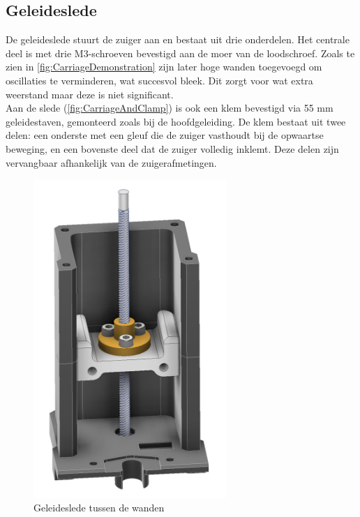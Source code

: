 \subsection{Geleideslede}
De geleideslede stuurt de zuiger aan en bestaat uit drie onderdelen. Het centrale deel is met drie M3-schroeven bevestigd aan de moer van de loodschroef. Zoals te zien in \autoref{fig:CarriageDemonstration} zijn later hoge wanden toegevoegd om oscillaties te verminderen, wat succesvol bleek. Dit zorgt voor wat extra weerstand maar deze is niet significant.
\\[12pt]Aan de slede (\autoref{fig:CarriageAndClamp}) is ook een klem bevestigd via 55 mm geleidestaven, gemonteerd zoals bij de hoofdgeleiding. De klem bestaat uit twee delen: een onderste met een gleuf die de zuiger vasthoudt bij de opwaartse beweging, en een bovenste deel dat de zuiger volledig inklemt. Deze delen zijn vervangbaar afhankelijk van de zuigerafmetingen.
\\[12pt]\begin{minipage}[t]{0.39\textwidth}
    \vspace{0pt}
    \begin{figure}[H]
        \centering
        \captionsetup{width=1\textwidth} %
        \includegraphics[width=0.65\textwidth]{figures/CarriageDemonstration.png}
        \caption{Geleideslede tussen de wanden}\label{fig:CarriageDemonstration}
    \end{figure}
\end{minipage}
